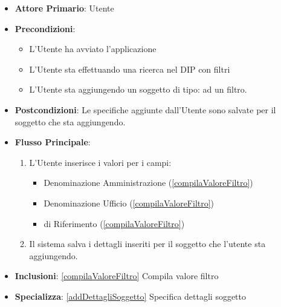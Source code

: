 \begin{itemize}
      \item \textbf{Attore Primario}: Utente
      \item \textbf{Precondizioni}: \begin{itemize}
            \item L'Utente ha avviato l'applicazione
            \item L'Utente sta effettuando una ricerca nel DIP con filtri
            \item L'Utente sta aggiungendo un soggetto di tipo:  ad un filtro.
      \end{itemize}
      \item \textbf{Postcondizioni}:  Le specifiche aggiunte dall'Utente sono salvate per il soggetto che sta aggiungendo.
      \item \textbf{Flusso Principale}:
            \begin{enumerate}
                  \item L'Utente inserisce i valori per i campi:
                        \begin{itemize}
                              \item Denominazione Amministrazione (\ref{compilaValoreFiltro})
                              \item Denominazione Ufficio (\ref{compilaValoreFiltro})
                              \item {} di Riferimento (\ref{compilaValoreFiltro})
                        \end{itemize}
                  \item Il sistema salva i dettagli inseriti per il soggetto che l'utente sta aggiungendo.
            \end{enumerate}
      \item \textbf{Inclusioni}: \ref{compilaValoreFiltro} Compila valore filtro
      \item \textbf{Specializza}: \ref{addDettagliSoggetto} Specifica dettagli soggetto
\end{itemize}

